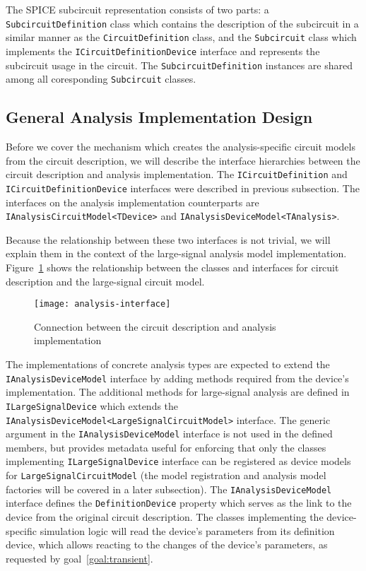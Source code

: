 The SPICE subcircuit representation consists of two parts: a \texttt{Subcircuit\+Definition} class which contains the description of the subcircuit in a similar manner as the \texttt{CircuitDefinition} class, and the \texttt{Subcircuit} class which implements the \texttt{ICircuitDefinitionDevice} interface and represents the subcircuit usage in the circuit. The \texttt{Subcircuit\+Definition} instances are shared among all coresponding \texttt{Subcircuit} classes.

\subsection{General Analysis Implementation Design}

Before we cover the mechanism which creates the analysis-specific circuit models from the circuit description, we will describe the interface hierarchies between the circuit description and analysis implementation. The \texttt{ICircuitDefinition} and \texttt{ICircuitDefinitionDevice} interfaces were described in previous subsection. The interfaces on the analysis implementation counterparts are \texttt{IAnalysis\+CircuitModel<TDevice>} and \texttt{IAnalysisDeviceModel<TAnalysis>}.

Because the relationship between these two interfaces is not trivial, we will explain them in the context of the large-signal analysis model implementation. Figure~\ref{chap:devdocs:analysis-design} shows the relationship between the classes and interfaces for circuit description and the large-signal circuit model.

\begin{figure}[h]
	\centering
	\texttt{[image: analysis-interface]}
	\caption{Connection between the circuit description and analysis implementation}
	\label{chap:devdocs:analysis-design}
\end{figure}

The implementations of concrete analysis types are expected to extend the \texttt{IAnalysisDeviceModel} interface by adding methods required from the device's implementation. The additional methods for large-signal analysis are defined in \texttt{ILargeSignalDevice} which extends the \texttt{IAnalysisDeviceModel<LargeSignal\+CircuitModel>} interface. The generic argument in the \texttt{IAnalysisDeviceModel} interface is not used in the defined members, but provides metadata useful for enforcing that only the classes implementing \texttt{ILargeSignalDevice} interface can be registered as device models for \texttt{LargeSignalCircuitModel} (the model registration and analysis model factories will be covered in a later subsection). The \texttt{IAnalysisDevice\+Model} interface defines the \texttt{DefinitionDevice} property which serves as the link to the device from the original circuit description. The classes implementing the device-specific simulation logic will read the device's parameters from its definition device, which allows reacting to the changes of the device's parameters, as requested by goal~\ref{goal:transient}.


